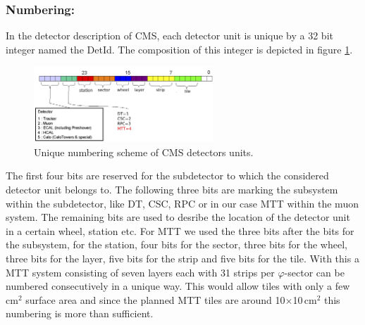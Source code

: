 			\subsubsection*{Numbering:}
			In the detector description of CMS, each detector unit is unique by a 32 bit integer named the DetId.
			The composition of this integer is depicted in figure \ref{fig:numbering}.
			\begin{figure}[htbp]
				\centering
				\includegraphics[width=0.6\textwidth]{Figures/erdogan/numbering.png}
				\caption{Unique numbering scheme of CMS detectors units.}
				\label{fig:numbering}
			\end{figure}
			The first four bits are reserved for the subdetector to which the considered detector unit belongs to.
			The following three bits are marking the subsystem within the subdetector, like DT, CSC, RPC or in our case MTT within the muon system.
			The remaining bits are used to desribe the location of the detector unit in a certain wheel, station etc.
			For MTT we used the three bits after the bits for the subsystem, for the station, four bits for the sector, three bits for the wheel, three bits for the layer, five bits for the strip and five bits
			for the tile.
			With this a MTT system consisting of seven layers each with 31 strips per $\varphi$-sector can be numbered consecutively in a unique way.
			This would allow tiles with only a few cm$^2$ surface area and since the planned MTT tiles are around 10$\times$10\,cm$^2$ this numbering is more than sufficient.
